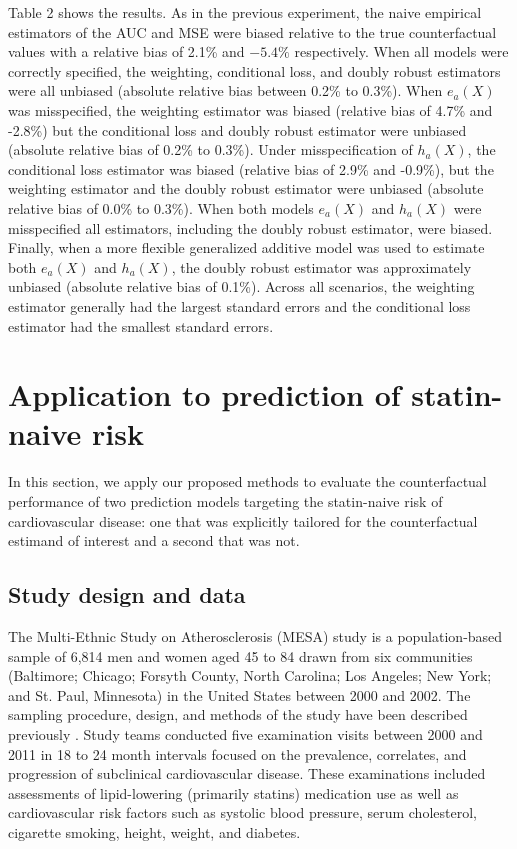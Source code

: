 Table 2 shows the results. As in the previous experiment, the naive empirical estimators of the AUC and MSE were biased relative to the true counterfactual values with a relative bias of 2.1\% and $-5.4\%$ respectively. When all models were correctly specified, the weighting, conditional loss, and doubly robust estimators were all unbiased (absolute relative bias between 0.2\% to 0.3\%). When $e_a(X)$ was misspecified, the weighting estimator was biased (relative bias of 4.7\% and -2.8\%) but the conditional loss and doubly robust estimator were unbiased (absolute relative bias of 0.2\% to 0.3\%). Under misspecification of $h_a(X)$, the conditional loss estimator was biased (relative bias of 2.9\% and -0.9\%), but the weighting estimator and the doubly robust estimator were unbiased (absolute relative bias of 0.0\% to 0.3\%). When both models $e_a(X)$ and $h_a(X)$ were misspecified all estimators, including the doubly robust estimator, were biased. Finally, when a more flexible generalized additive model was used to estimate both $e_a(X)$ and $h_a(X)$, the doubly robust estimator was approximately unbiased (absolute relative bias of 0.1\%). Across all scenarios, the weighting estimator generally had the largest standard errors and the conditional loss estimator had the smallest standard errors.

\section{Application to prediction of statin-naive risk} \label{sec:results}
In this section, we apply our proposed methods to evaluate the counterfactual performance of two prediction models targeting the statin-naive risk of cardiovascular disease: one that was explicitly tailored for the counterfactual estimand of interest and a second that was not. 

\subsection{Study design and data}
The Multi-Ethnic Study on Atherosclerosis (MESA) study is a population-based sample of 6,814 men and women aged 45 to 84 drawn from six communities (Baltimore; Chicago; Forsyth County, North Carolina; Los Angeles; New York; and St. Paul, Minnesota) in the United States between 2000 and 2002. The sampling procedure, design, and methods of the study have been described previously \cite{bild_multi-ethnic_2002}. Study teams conducted five examination visits between 2000 and 2011 in 18 to 24 month intervals focused on the prevalence, correlates, and progression of subclinical cardiovascular disease. These examinations included assessments of lipid-lowering (primarily statins) medication use as well as cardiovascular risk factors such as systolic blood pressure, serum cholesterol, cigarette smoking, height, weight, and diabetes. 


